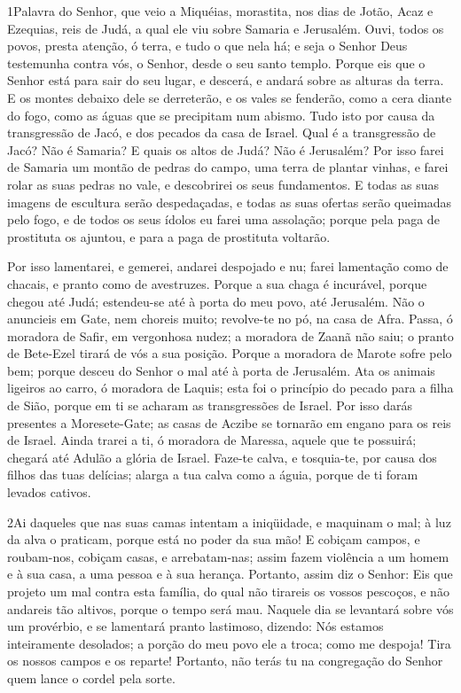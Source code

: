 
\lettrine{1} Palavra do Senhor, que veio a Miquéias,
morastita, nos dias de Jotão, Acaz e Ezequias, reis de Judá, a qual
ele viu sobre Samaria e Jerusalém. Ouvi, todos os povos, presta
atenção, ó terra, e tudo o que nela há; e seja o Senhor Deus
testemunha contra vós, o Senhor, desde o seu santo templo.
Porque eis que o Senhor está para sair do seu lugar, e descerá,
e andará sobre as alturas da terra. E os montes debaixo dele se
derreterão, e os vales se fenderão, como a cera diante do fogo, como
as águas que se precipitam num abismo. Tudo isto por causa da
transgressão de Jacó, e dos pecados da casa de Israel. Qual é a
transgressão de Jacó? Não é Samaria? E quais os altos de Judá? Não é
Jerusalém? Por isso farei de Samaria um montão de pedras do
campo, uma terra de plantar vinhas, e farei rolar as suas pedras no
vale, e descobrirei os seus fundamentos. E todas as suas imagens
de escultura serão despedaçadas, e todas as suas ofertas serão
queimadas pelo fogo, e de todos os seus ídolos eu farei uma
assolação; porque pela paga de prostituta os ajuntou, e para a paga
de prostituta voltarão.

Por isso lamentarei, e gemerei, andarei despojado e nu; farei
lamentação como de chacais, e pranto como de avestruzes. Porque
a sua chaga é incurável, porque chegou até Judá; estendeu-se até à
porta do meu povo, até Jerusalém. Não o anuncieis em Gate,
nem choreis muito; revolve-te no pó, na casa de Afra. Passa,
ó moradora de Safir, em vergonhosa nudez; a moradora de Zaanã não
saiu; o pranto de Bete-Ezel tirará de vós a sua posição.
Porque a moradora de Marote sofre pelo bem; porque desceu do
Senhor o mal até à porta de Jerusalém. Ata os animais
ligeiros ao carro, ó moradora de Laquis; esta foi o princípio do
pecado para a filha de Sião, porque em ti se acharam as
transgressões de Israel. Por isso darás presentes a
Moresete-Gate; as casas de Aczibe se tornarão em engano para os reis
de Israel. Ainda trarei a ti, ó moradora de Maressa, aquele
que te possuirá; chegará até Adulão a glória de Israel.
Faze-te calva, e tosquia-te, por causa dos filhos das tuas
delícias; alarga a tua calva como a águia, porque de ti foram
levados cativos.

\medskip

\lettrine{2} Ai daqueles que nas suas camas intentam a
iniqüidade, e maquinam o mal; à luz da alva o praticam, porque está
no poder da sua mão! E cobiçam campos, e roubam-nos, cobiçam
casas, e arrebatam-nas; assim fazem violência a um homem e à sua
casa, a uma pessoa e à sua herança. Portanto, assim diz o
Senhor: Eis que projeto um mal contra esta família, do qual não
tirareis os vossos pescoços, e não andareis tão altivos, porque o
tempo será mau. Naquele dia se levantará sobre vós um provérbio,
e se lamentará pranto lastimoso, dizendo: Nós estamos inteiramente
desolados; a porção do meu povo ele a troca; como me despoja! Tira
os nossos campos e os reparte! Portanto, não terás tu na
congregação do Senhor quem lance o cordel pela sorte.

